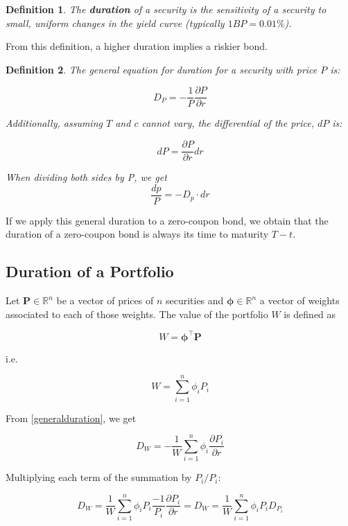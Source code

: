 \documentclass[10pt,letterpaper]{article}
\newtheorem{definition}{Definition}
\begin{document}
\begin{definition}
The \emph{\textbf{duration}} of a security is the sensitivity of a security to small, uniform changes in the yield curve (typically $1BP = 0.01\%$).
\end{definition}

From this definition, a higher duration implies a riskier bond.

\begin{definition}
The general equation for duration for a security with price $P$ is:

\begin{equation}\label{generalduration}
D_P = -\frac{1}{P}\frac{\partial P}{\partial r}
\end{equation}

Additionally, assuming $T$ and $c$ cannot vary, the differential of the price, $dP$ is:

$$dP = \frac{\partial P}{\partial r} dr$$

When dividing both sides by P, we get
\begin{equation}\label{generaldurationdiff}
\frac{dp}{P} = -D_p\cdot dr
\end{equation}
\end{definition}

If we apply this general duration to a zero-coupon bond, we obtain that the duration of a zero-coupon bond is always its time to maturity $T - t$.

\subsection{Duration of a Portfolio}

Let $\mathbf{P}\in\mathbb{R}^n$ be a vector of prices of $n$ securities and $\mathbf{\phi}\in\mathbb{R}^n$ a vector of weights associated to each of those weights. The value of the portfolio $W$ is defined as 

$$W = \mathbf{\phi}^\intercal\mathbf{P}$$

i.e.

$$W = \sum_{i=1}^n \phi_i P_i$$

From \eqref{generalduration}, we get

$$D_W= -\frac{1}{W}\sum_{i=1}^n \phi_i\frac{\partial P_i}{\partial r}$$

Multiplying each term of the summation by $P_i/P_i$:

$$D_W=\frac{1}{W}\sum_{i=1}^n \phi_i P_i\frac{-1}{P_i}\frac{\partial P_i}{\partial r} = D_W=\frac{1}{W}\sum_{i=1}^n \phi_i P_iD_{P_i}$$
\end{document}

